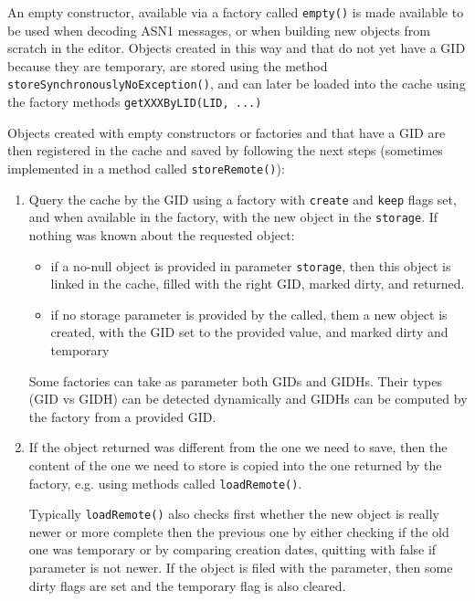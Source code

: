 \documentclass{book}
\newcommand{\mth}[1]{{\tt #1}}
\newcommand{\mmb}[1]{{\tt #1}}
\begin{document}
An empty constructor, available via a factory called \mth{empty()} is made available to be used when decoding
ASN1 messages, or when building new objects from scratch in the editor. Objects created in this way and that do not yet have 
a GID because they are temporary, are stored using the method
\mth{storeSynchronouslyNoException()}, and can later be loaded into the cache using the factory methods \mth{getXXXByLID(LID, ...)}

Objects created with empty constructors or factories and that have a GID
are then registered in the cache and saved by following the next steps (sometimes implemented in a method called  \mth{storeRemote()}):
\begin{enumerate}
\item
Query the cache by the GID using a factory with \mmb{create} and \mmb{keep} flags set, and when available in the factory, with the new object in the \mmb{storage}. If nothing was known about the requested object:
\begin{itemize}
\item if a no-null object is provided in parameter \mmb{storage}, then this object is linked in the cache, filled with the right GID, marked dirty, and returned. 
\item if no storage parameter is provided by the called, them a new object is created, with the GID set to the provided value, and 
marked dirty and temporary
\end{itemize}

Some factories can take as parameter both GIDs and GIDHs. Their types (GID vs GIDH) can be detected dynamically and GIDHs can be computed
by the factory from a provided GID.
\item
If the object returned was different from the one we need to save, then the content of the one we need to store is copied
into the one returned by the factory, e.g. using methods called \mth{loadRemote()}.

Typically \mth{loadRemote()} also checks first whether the new object is really newer or more complete then the previous
one by either checking if the old one was temporary or by comparing creation dates, quitting with false if parameter is not newer. 
If the object is filed with the parameter, then some dirty flags are set and the temporary flag
is also cleared.


\end{enumerate}
\end{document}

